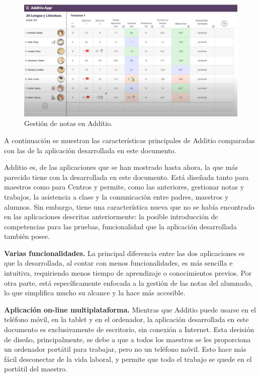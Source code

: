 \begin{figure}[h]
\centering\includegraphics[width=1\linewidth]{figs/additio.png}
\caption{Gestión de notas en Additio.\cite{additioyoutube}}
\label{Fig:additio}
\end{figure}

A continuación se muestran las características principales de Additio comparadas con las de la aplicación desarrollada en este documento.

Additio es, de las aplicaciones que se han mostrado hasta ahora, la que más parecido tiene con la desarrollada en este documento. Está diseñada tanto para maestros como para Centros y permite, como las anteriores, gestionar notas y trabajos, la asistencia a clase y la comunicación entre padres, maestros y alumnos. Sin embargo, tiene una característica nueva que no se había encontrado en las aplicaciones descritas anteriormente: la posible introducción de competencias para las pruebas, funcionalidad que la aplicación desarrollada también posee.

\textbf {Varias funcionalidades.} La principal diferencia entre las dos aplicaciones es que la desarrollada, al contar con menos funcionalidades, es más sencilla e intuitiva, requiriendo menos tiempo de aprendizaje o conocimientos previos. Por otra parte, está específicamente enfocada a la gestión de las notas del alumnado, lo que simplifica mucho su alcance y la hace más accesible.

\textbf {Aplicación on-line multiplataforma.} Mientras que Additio puede usarse en el teléfono móvil, en la tablet y en el ordenador, la aplicación desarrollada en este documento es exclusivamente de escritorio, sin conexión a Internet. Esta decisión de diseño, principalmente, se debe a que a todos los maestros se les proporciona un ordenador portátil para trabajar, pero no un teléfono móvil. Esto hace más fácil desconectar de la vida laboral, y permite que todo el trabajo se quede en el portátil del maestro.
 
